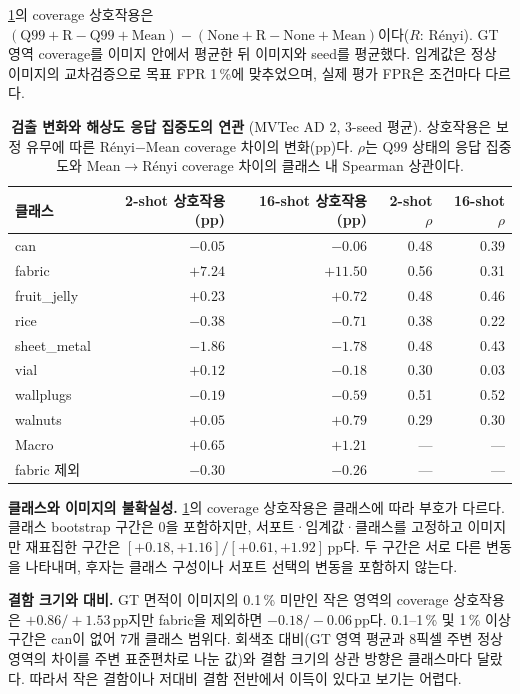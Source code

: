 \cref{tab:mechanism_class_effects}의 coverage 상호작용은 $(\mathrm{Q99{+}R}-\mathrm{Q99{+}Mean})-(\mathrm{None{+}R}-\mathrm{None{+}Mean})$이다($R$: Rényi).
GT 영역 coverage를 이미지 안에서 평균한 뒤 이미지와 seed를 평균했다. 임계값은 정상 이미지의 교차검증으로 목표 FPR 1\,\%에 맞추었으며, 실제 평가 FPR은 조건마다 다르다.

\begin{table}[!tbp]
\centering\small\setlength{\tabcolsep}{8pt}
\caption{\textbf{검출 변화와 해상도 응답 집중도의 연관} (MVTec AD 2, 3-seed 평균). 상호작용은 보정 유무에 따른 Rényi$-$Mean coverage 차이의 변화(pp)다. $\rho$는 Q99 상태의 응답 집중도와 Mean$\rightarrow$Rényi coverage 차이의 클래스 내 Spearman 상관이다.}
\label{tab:mechanism_class_effects}
\begin{tabular}{l r r r r}
\toprule
클래스 & 2-shot 상호작용 (pp) & 16-shot 상호작용 (pp) & 2-shot $\rho$ & 16-shot $\rho$ \\
\midrule
can & $-0.05$ & $-0.06$ & 0.48 & 0.39 \\
fabric & $+7.24$ & $+11.50$ & 0.56 & 0.31 \\
fruit\_jelly & $+0.23$ & $+0.72$ & 0.48 & 0.46 \\
rice & $-0.38$ & $-0.71$ & 0.38 & 0.22 \\
sheet\_metal & $-1.86$ & $-1.78$ & 0.48 & 0.43 \\
vial & $+0.12$ & $-0.18$ & 0.30 & 0.03 \\
wallplugs & $-0.19$ & $-0.59$ & 0.51 & 0.52 \\
walnuts & $+0.05$ & $+0.79$ & 0.29 & 0.30 \\
\midrule
Macro & $+0.65$ & $+1.21$ & --- & --- \\
fabric 제외 & $-0.30$ & $-0.26$ & --- & --- \\
\bottomrule
\end{tabular}
\end{table}

\noindent\textbf{클래스와 이미지의 불확실성.}
\cref{tab:mechanism_class_effects}의 coverage 상호작용은 클래스에 따라 부호가 다르다.
클래스 bootstrap 구간은 0을 포함하지만, 서포트·임계값·클래스를 고정하고 이미지만 재표집한 구간은 $[+0.18,+1.16]/[+0.61,+1.92]$\,pp다.
두 구간은 서로 다른 변동을 나타내며, 후자는 클래스 구성이나 서포트 선택의 변동을 포함하지 않는다.

\noindent\textbf{결함 크기와 대비.}
GT 면적이 이미지의 0.1\,\% 미만인 작은 영역의 coverage 상호작용은 $+0.86/+1.53$\,pp지만 fabric을 제외하면 $-0.18/-0.06$\,pp다.
0.1--1\,\% 및 1\,\% 이상 구간은 can이 없어 7개 클래스 범위다.
회색조 대비(GT 영역 평균과 8픽셀 주변 정상 영역의 차이를 주변 표준편차로 나눈 값)와 결함 크기의 상관 방향은 클래스마다 달랐다.
따라서 작은 결함이나 저대비 결함 전반에서 이득이 있다고 보기는 어렵다.

